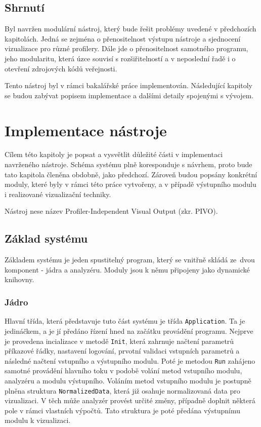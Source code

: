 \documentclass[czech,BP]{thesiskiv}
\begin{document}
\section{Shrnutí}

Byl navržen modulární nástroj, který bude řešit problémy uvedené v předchozích kapitolách. Jedná se zejména o přenositelnost výstupu nástroje a sjednocení vizualizace pro různé profilery. Dále jde o přenositelnost samotného programu, jeho modularitu, která úzce souvisí s rozšiřitelností a v neposlední řadě i o otevření zdrojových kódů veřejnosti.

Tento nástroj byl v rámci bakalářské práce implementován. Následující kapitoly se budou zabývat popisem implementace a dalšími detaily spojenými s vývojem.


\newpage

\chapter{Implementace nástroje}

Cílem této kapitoly je popsat a vysvětlit důležité části v implementaci navrženého nástroje. Schéma systému plně koresponduje s návrhem, proto bude tato kapitola členěna obdobně, jako předchozí. Zároveň budou popsány konkrétní moduly, které byly v rámci této práce vytvořeny, a v případě výstupního modulu i realizované vizualizační techniky.

Nástroj nese název Profiler-Independent Visual Output (zkr. PIVO).

\section{Základ systému}

Základem systému je jeden spustitelný program, který se vnitřně skládá ze~dvou komponent - jádra a analyzéru. Moduly jsou k němu připojeny jako dynamické knihovny.

\subsection{Jádro}

Hlavní třída, která představuje tuto část systému je třída \texttt{Application}. Ta je jedináčkem, a je jí předáno řízení hned na začátku provádění programu. Nejprve je provedena incializace v metodě \texttt{Init}, která zahrnuje načtení parametrů příkazové řádky, nastavení logování, prvotní validaci vstupních parametrů a následné načtení vstupního a výstupního modulu. Poté je metodou \texttt{Run} zahájeno samotné provádění hlavního toku v podobě volání metod vstupního modulu, analyzéru a modulu výstupního. Voláním metod vstupního modulu je postupně plněna struktura \texttt{NormalizedData}, která již osahuje normalizovaná data pro vizualizaci. V těch může analyzér provést určité změny, případně doplnit některá pole v rámci vlastních výpočtů. Tato struktura je poté předána výstupnímu modulu k vizualizaci.
\end{document}
